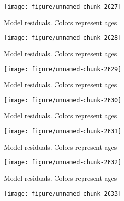 \documentclass[a4paper]{article}\usepackage{graphicx, color}
\makeatletter
\def\maxwidth{ %
  \ifdim\Gin@nat@width>\linewidth
    \linewidth
  \else
    \Gin@nat@width
  \fi
}
\newenvironment{knitrout}{}{} %
\makeatother
\begin{document}
\begin{knitrout}
\begin{figure}[H]
{\centering \texttt{[image: figure/unnamed-chunk-2627]} 

}

\caption[Model residuals]{Model residuals. Colors represent ages\label{fig:unnamed-chunk-2627}}
\end{figure}
\begin{figure}[H]


{\centering \texttt{[image: figure/unnamed-chunk-2628]} 

}

\caption[Model residuals]{Model residuals. Colors represent ages\label{fig:unnamed-chunk-2628}}
\end{figure}
\begin{figure}[H]


{\centering \texttt{[image: figure/unnamed-chunk-2629]} 

}

\caption[Model residuals]{Model residuals. Colors represent ages\label{fig:unnamed-chunk-2629}}
\end{figure}
\begin{figure}[H]


{\centering \texttt{[image: figure/unnamed-chunk-2630]} 

}

\caption[Model residuals]{Model residuals. Colors represent ages\label{fig:unnamed-chunk-2630}}
\end{figure}
\begin{figure}[H]


{\centering \texttt{[image: figure/unnamed-chunk-2631]} 

}

\caption[Model residuals]{Model residuals. Colors represent ages\label{fig:unnamed-chunk-2631}}
\end{figure}
\begin{figure}[H]


{\centering \texttt{[image: figure/unnamed-chunk-2632]} 

}

\caption[Model residuals]{Model residuals. Colors represent ages\label{fig:unnamed-chunk-2632}}
\end{figure}
\begin{figure}[H]


{\centering \texttt{[image: figure/unnamed-chunk-2633]} 

}


\end{figure}
\end{knitrout}
\end{document}
